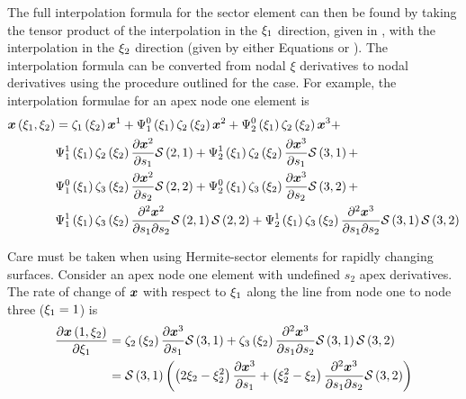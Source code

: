 The full interpolation formula for the sector element can then be found by
taking the tensor product of the interpolation in the $\xi_{1}$ direction,
given in , with the interpolation in the
$\xi_{2}$ direction (given by either Equations  or
). The interpolation formula can be converted from
nodal $\xi$ derivatives to nodal \arclen derivatives using the procedure
outlined for the \bicubicherm case. For example, the interpolation formulae for
an apex node one element is 
\begin{equation}
  \begin{split}
    \fnof{\vect{x}}{\xione,\xitwo} &=
    \hsonebfn{1}{\xitwo}\nodept{\vect{x}}{1}+\chbfn{1}{0}{\xione}\hsonebfn{2}
    {\xitwo}\nodept{\vect{x}}{2}+\chbfn{2}{0}{\xione}\hsonebfn{2}{\xitwo}
    \nodept{\vect{x}}{3} + \\
    & \chbfn{1}{1}{\xione}\hsonebfn{2}{\xitwo}\delby{\nodept{\vect{x}}{2}}{s_{1}}
    \nsftwo{2}{1}+\chbfn{2}{1}{\xione}\hsonebfn{2}{\xitwo}\delby{\nodept{\vect{x}}
      {3}}{s_{1}}\nsftwo{3}{1} + \\
    & \chbfn{1}{0}{\xione}\hsonebfn{3}{\xitwo}\delby{\nodept{\vect{x}}{2}}{s_{2}}
    \nsftwo{2}{2} + \chbfn{2}{0}{\xione}\hsonebfn{3}{\xitwo}
    \delby{\nodept{\vect{x}}{3}}{s_{2}}\nsftwo{3}{2} + \\
    & \chbfn{1}{1}{\xione}\hsonebfn{3}{\xitwo}\deltwoby{\nodept{\vect{x}}{2}}
    {s_{1}}{s_{2}}\nsftwo{2}{1}\nsftwo{2}{2} + 
    \chbfn{2}{1}{\xione}\hsonebfn{3}{\xitwo}\deltwoby{\nodept{\vect{x}}{3}}
    {s_{1}}{s_{2}}\nsftwo{3}{1}\nsftwo{3}{2}    
  \end{split}
  \label{eqn:hsapex1sinterp}
\end{equation}

Care must be taken when using Hermite-sector elements for rapidly changing
surfaces. Consider an apex node one element with undefined $s_{2}$ apex
derivatives. The rate of change of $\vect{x}$ with respect to
$\xi_{1}$ along the line from node one to node three (\ie $\xi_{1}=1$) is
\begin{equation}
  \begin{split}
    \delby{\fnof{\vect{x}}{1,\xitwo}}{\xione} &= \hsonebfn{2}{\xitwo}\delby{
      \nodept{\vect{x}}{3}}{s_{1}}\nsftwo{3}{1}+\hsonebfn{3}{\xitwo}\deltwoby{
      \nodept{\vect{x}}{3}}{s_{1}}{s_{2}}\nsftwo{3}{1}\nsftwo{3}{2} \\
    &= \nsftwo{3}{1}\pbrac{\pbrac{2\xitwo-\xitwo^{2}}\delby{\nodept{\vect{x}}{3}}
      {s_{1}}+\pbrac{\xitwo^{2}-\xitwo}\deltwoby{\nodept{\vect{x}}{3}}{s_{1}}{s_{2}}
      \nsftwo{3}{2}}
  \end{split}
\end{equation}

